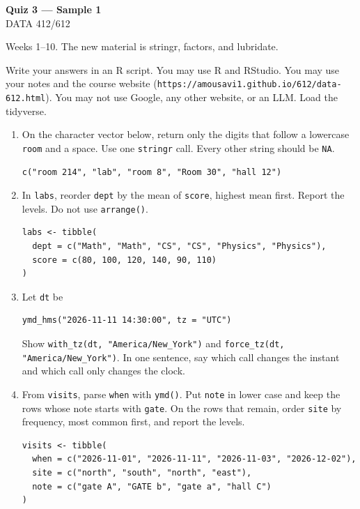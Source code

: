 \documentclass[11pt]{article}
\begin{document}
\begin{center}
{\LARGE\bfseries Quiz 3 --- Sample 1}\\[0.35em]
DATA 412/612
\end{center}

\vspace{0.25em}

Weeks 1--10. The new material is stringr, factors, and lubridate.

Write your answers in an R script. You may use R and RStudio.
You may use your notes and the course website
(\texttt{https://amousavi1.github.io/612/data-612.html}).
You may not use Google, any other website, or an LLM.
Load the tidyverse.

\begin{enumerate}
\item On the character vector below, return only the digits that
follow a lowercase \texttt{room} and a space. Use one \texttt{stringr}
call. Every other string should be \texttt{NA}.

\begin{lstlisting}
c("room 214", "lab", "room 8", "Room 30", "hall 12")
\end{lstlisting}

\item In \texttt{labs}, reorder \texttt{dept} by the mean of
\texttt{score}, highest mean first. Report the levels.
Do not use \texttt{arrange()}.

\begin{lstlisting}
labs <- tibble(
  dept = c("Math", "Math", "CS", "CS", "Physics", "Physics"),
  score = c(80, 100, 120, 140, 90, 110)
)
\end{lstlisting}

\item Let \texttt{dt} be

\begin{lstlisting}
ymd_hms("2026-11-11 14:30:00", tz = "UTC")
\end{lstlisting}

Show \texttt{with\_tz(dt, "America/New\_York")} and
\texttt{force\_tz(dt, "America/New\_York")}.
In one sentence, say which call changes the instant and which
call only changes the clock.

\item From \texttt{visits}, parse \texttt{when} with \texttt{ymd()}.
Put \texttt{note} in lower case and keep the rows whose note starts
with \texttt{gate}. On the rows that remain, order \texttt{site}
by frequency, most common first, and report the levels.

\begin{lstlisting}
visits <- tibble(
  when = c("2026-11-01", "2026-11-11", "2026-11-03", "2026-12-02"),
  site = c("north", "south", "north", "east"),
  note = c("gate A", "GATE b", "gate a", "hall C")
)
\end{lstlisting}
\end{enumerate}
\end{document}

